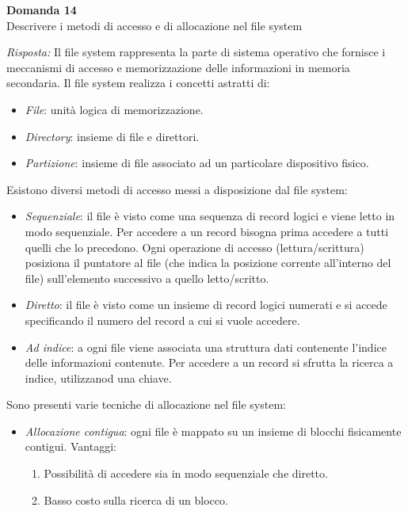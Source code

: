 \documentclass{article}
\newenvironment{problem}[2][Domanda]
    { \begin{mdframed}[backgroundcolor=gray!20] \textbf{#1 #2} \\}
    {  \end{mdframed}}
\newenvironment{solution}
    {\textit{Risposta:}}
    {}
\begin{document}
\begin{problem}{14}
Descrivere i metodi di accesso e di allocazione nel file system
\end{problem}
\begin{solution}
Il file system rappresenta la parte di sistema operativo che fornisce i meccanismi di accesso e memorizzazione delle informazioni in memoria secondaria.
\newline
Il file system realizza i concetti astratti di:
\begin{itemize}
    \item \emph{File}: unità logica di memorizzazione.
    \item \emph{Directory}: insieme di file e direttori.
    \item \emph{Partizione}: insieme di file associato ad un particolare dispositivo fisico.
\end{itemize}
Esistono diversi metodi di accesso messi a disposizione dal file system:
\begin{itemize}
    \item \emph{Sequenziale}: il file è visto come una sequenza di record logici e viene letto in modo sequenziale. Per accedere a un record bisogna prima accedere a tutti quelli che lo precedono. Ogni operazione di accesso (lettura/scrittura) posiziona il puntatore al file (che indica la posizione corrente all’interno del file) sull’elemento successivo a quello letto/scritto. 
    \item \emph{Diretto}: il file è visto come un insieme di record logici numerati e si accede specificando il numero del record a cui si vuole accedere.
    \item \emph{Ad indice}: a ogni file viene associata una struttura dati contenente l’indice delle informazioni contenute. Per accedere a un record si sfrutta la ricerca a indice, utilizzanod una chiave. 
\end{itemize} 
Sono presenti varie tecniche di allocazione nel file system:
\begin{itemize}
    \item  \emph{Allocazione contigua}: ogni file è mappato su un insieme di blocchi fisicamente contigui.
    \newline
    \newline
    Vantaggi:
    \begin{enumerate}
        \item Possibilità di accedere sia in modo sequenziale che diretto.
        \item Basso costo sulla ricerca di un blocco.

\end{enumerate}
\end{itemize}
\end{solution}
\end{document}
